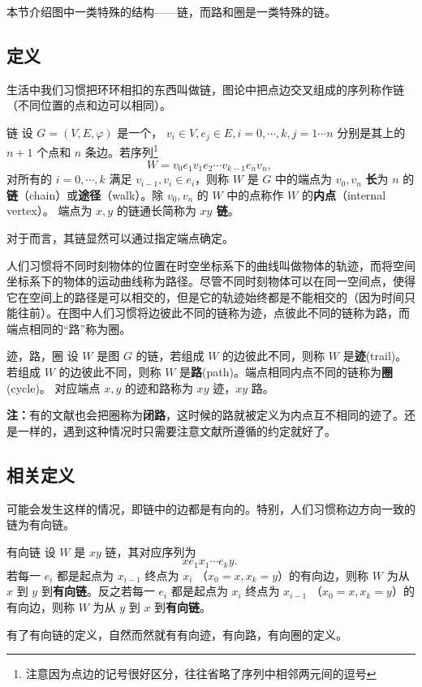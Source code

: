 
本节介绍图中一类特殊的结构——链，而路和圈是一类特殊的链。

\subsection{定义}
生活中我们习惯把环环相扣的东西叫做链，图论中把点边交叉组成的序列称作链（不同位置的点和边可以相同）。

\begin{definition}{链}
设 $G=(V,E,\varphi)$ 是一个， $v_i\in V,e_j\in E,i=0,\cdots,k,j=1\cdots n$ 分别是其上的 $n+1$ 个点和 $n$ 条边。若序列\footnote{注意因为点边的记号很好区分，往往省略了序列中相邻两元间的逗号}
\begin{equation}
W=v_0 e_1v_1e_2\cdots v_{k-1} e_nv_n,~
\end{equation}
对所有的 $i=0,\cdots,k$ 满足 $v_{i-1},v_{i}\in e_{i}$，则称 $W$ 是 $G$ 中的端点为 $v_0,v_n$ \textbf{长}为 $n$ 的\textbf{链}（chain）或\textbf{途径}（walk）。除 $v_0,v_n$ 的 $W$ 中的点称作 $W$ 的\textbf{内点}（internal vertex）。 端点为 $x,y$ 的链通长简称为 \textbf{$xy$ 链}。
\end{definition}
对于而言，其链显然可以通过指定端点确定。

人们习惯将不同时刻物体的位置在时空坐标系下的曲线叫做物体的轨迹，而将空间坐标系下的物体的运动曲线称为路径。尽管不同时刻物体可以在同一空间点，使得它在空间上的路径是可以相交的，但是它的轨迹始终都是不能相交的（因为时间只能往前）。在图中人们习惯将边彼此不同的链称为迹，点彼此不同的链称为路，而端点相同的“路”称为圈。
\begin{definition}{迹，路，圈}
设 $W$ 是图 $G$ 的链，若组成 $W$ 的边彼此不同，则称 $W$ 是\textbf{迹}(trail)。若组成 $W$ 的边彼此不同，则称 $W$ 是\textbf{路}(path)。端点相同内点不同的链称为\textbf{圈}(cycle)。 对应端点 $x,y$ 的迹和路称为 $xy$ 迹，$xy$ 路。
\end{definition}
\textbf{注：}有的文献也会把圈称为\textbf{闭路}，这时候的路就被定义为内点互不相同的迹了。还是一样的，遇到这种情况时只需要注意文献所遵循的约定就好了。

\subsection{相关定义}

可能会发生这样的情况，即链中的边都是有向的。特别，人们习惯称边方向一致的链为有向链。
\begin{definition}{有向链}
设 $W$ 是 $xy$ 链，其对应序列为
\begin{equation}
xe_1x_1\cdots e_ky.~
\end{equation}
若每一 $e_i$ 都是起点为 $x_{i-1}$ 终点为 $x_i$ （$x_0=x,x_k=y$）的有向边，则称 $W$ 为从 $x$ 到 $y$ 到\textbf{有向链}。反之若每一 $e_i$ 都是起点为 $x_{i}$ 终点为 $x_{i-1}$ （$x_0=x,x_k=y$）的有向边，则称 $W$ 为从 $y$ 到 $x$ 到\textbf{有向链}。
\end{definition}
有了有向链的定义，自然而然就有有向迹，有向路，有向圈的定义。

